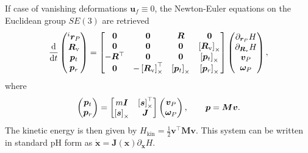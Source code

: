 \begin{remark}
	If case of vanishing deformations $\bm{u}_f \equiv 0$, the Newton-Euler equations on the Euclidean group $SE(3)$ are retrieved \cite{celledoni2018passivity}
	\begin{equation*}
	\diff{}{t}
	\begin{pmatrix}
	^i{\bm{r}}_P \\
	\bm{R}_{\mathrm{v}} \\
	{\bm{p}}_t \\ 
	{\bm{p}}_r \\
	\end{pmatrix} = 
	\begin{bmatrix}
	\bm{0} & \bm{0} &\bm{R} & \bm{0} \\
	\bm{0} & \bm{0} & \bm{0} & \crmat{\bm{R}_{\mathrm{v}}} \\
	- \bm{R}^\top & \bm{0} & \bm{0} & \crmat{\bm{p}_t}\\
	\bm{0} & -\crmat{\bm{R}_{\mathrm{v}}}^\top & \crmat{\bm{p}_t} & \crmat{\bm{p}_r} \\
	\end{bmatrix}
	\begin{pmatrix}
	\partial_{\bm{r}_P} H \\ \partial_{\bm{R}_{\mathrm{v}}} H \\ \bm{v}_P \\ \bm{\omega}_P  \\
	\end{pmatrix},
	\end{equation*}
	where
	\begin{equation*}
	\begin{pmatrix}
	\bm{p}_t \\ \bm{p}_r \\ 
	\end{pmatrix} = 
	\begin{bmatrix}
	m \bm{I} & \left[\bm{s}\right]_\times^\top \\
	\left[\bm{s}\right]_\times & \bm{J} \\
	\end{bmatrix}
	\begin{pmatrix}
	\bm{v}_P \\ \bm{\omega}_P  \\ 
	\end{pmatrix}, \qquad \bm{p} = \bm{M} \bm{v}.
	\end{equation*}
	The kinetic energy is then given by $H_{\mathrm{kin}} = \frac{1}{2} \bm{v}^\top \bm{M} \bm{v}$.
	This system can be written in standard pH form as $\dot{\bm{x}} = \bm{J}(\bm{x})\partial_{\bm{x}} H$.
\end{remark}

